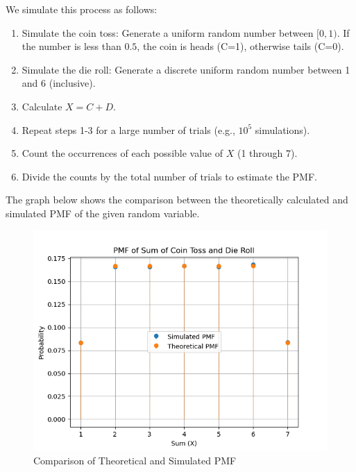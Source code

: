 \documentclass[journal]{IEEEtran}
\begin{document}
We simulate this process as follows:
\begin{enumerate}
    \item Simulate the coin toss: Generate a uniform random number between $[0, 1)$. If the number is less than $0.5$, the coin is heads (C=1), otherwise tails (C=0).
    \item Simulate the die roll: Generate a discrete uniform random number between 1 and 6 (inclusive).
    \item Calculate $X = C + D$.
    \item Repeat steps 1-3 for a large number of trials (e.g., $10^5$ simulations).
    \item Count the occurrences of each possible value of $X$ (1 through 7).
    \item Divide the counts by the total number of trials to estimate the PMF.
\end{enumerate}

The graph below shows the comparison between the theoretically calculated and simulated PMF of the given random variable.

\begin{figure}[htbp]
    \centering
    \includegraphics[width=\columnwidth]{fig/coin_die_pmf.png}
    \caption{Comparison of Theoretical and Simulated PMF}
\end{figure}
\end{document}

